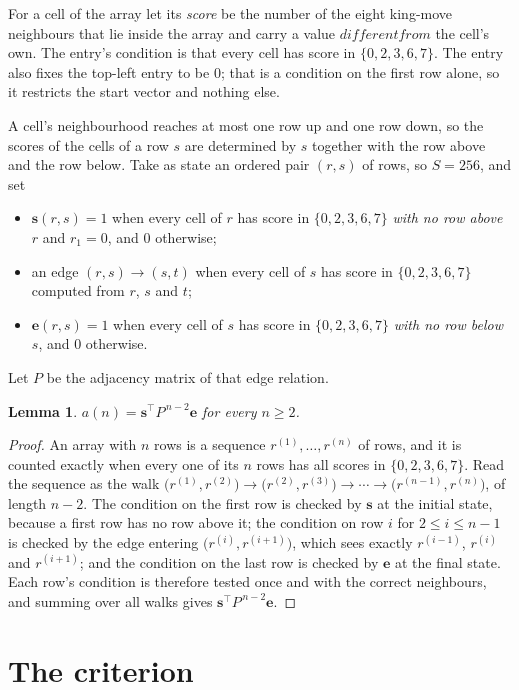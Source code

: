 \documentclass[11pt,a4paper]{article}
\theoremstyle{plain}
\newtheorem{lemma}[theorem]{Lemma}
\theoremstyle{definition}
\begin{document}
For a cell of the array let its \emph{score} be the number of the eight king-move neighbours that lie inside
the array and carry a value $different from$ the cell's own. The entry's condition is that every cell
has score in $\{0,2,3,6,7\}$. The entry also fixes the top-left entry to be $0$; that is a condition on the first row alone, so it restricts the start vector and nothing else.

A cell's neighbourhood reaches at most one row up and one row down, so the scores of the
cells of a row $s$ are determined by $s$ together with the row above and the row below.
Take as state an ordered pair $(r,s)$ of rows, so $S=256$, and set
\begin{itemize}
\item $\mathbf{s}(r,s)=1$ when every cell of $r$ has score in $\{0,2,3,6,7\}$ \emph{with no row
above $r$} and $r_1=0$, and $0$ otherwise;
\item an edge $(r,s)\to(s,t)$ when every cell of $s$ has score in $\{0,2,3,6,7\}$ computed from
$r$, $s$ and $t$;
\item $\mathbf{e}(r,s)=1$ when every cell of $s$ has score in $\{0,2,3,6,7\}$ \emph{with no row
below $s$}, and $0$ otherwise.
\end{itemize}
Let $P$ be the adjacency matrix of that edge relation.

\begin{lemma}\label{lem:walk}
$a(n)=\mathbf{s}^{\!\top}P^{\,n-2}\mathbf{e}$ for every $n\ge2$.
\end{lemma}

\begin{proof}
An array with $n$ rows is a sequence $r^{(1)},\dots,r^{(n)}$ of rows, and it is counted
exactly when every one of its $n$ rows has all scores in $\{0,2,3,6,7\}$. Read the sequence as the
walk $\bigl(r^{(1)},r^{(2)}\bigr)\to\bigl(r^{(2)},r^{(3)}\bigr)\to\cdots\to
\bigl(r^{(n-1)},r^{(n)}\bigr)$, of length $n-2$. The condition on the first row is
checked by $\mathbf{s}$ at the initial state, because a first row has no row above it; the
condition on row $i$ for $2\le i\le n-1$ is checked by the edge entering
$\bigl(r^{(i)},r^{(i+1)}\bigr)$, which sees exactly $r^{(i-1)}$, $r^{(i)}$ and
$r^{(i+1)}$; and the condition on the last row is checked by $\mathbf{e}$ at the final
state. Each row's condition is therefore tested once and with the correct neighbours, and
summing over all walks gives $\mathbf{s}^{\!\top}P^{\,n-2}\mathbf{e}$.
\end{proof}

\section{The criterion}
\end{document}
